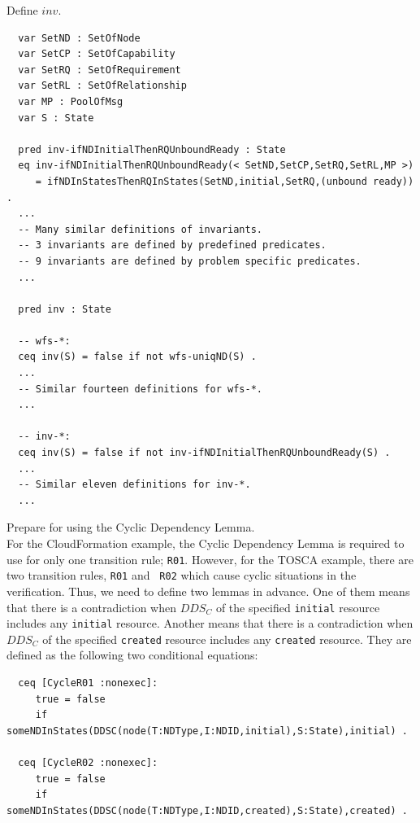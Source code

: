 \documentclass[12pt]{report}
\begin{document}
 Define $inv$. 
\small
\begin{verbatim}
  var SetND : SetOfNode
  var SetCP : SetOfCapability
  var SetRQ : SetOfRequirement
  var SetRL : SetOfRelationship
  var MP : PoolOfMsg
  var S : State

  pred inv-ifNDInitialThenRQUnboundReady : State
  eq inv-ifNDInitialThenRQUnboundReady(< SetND,SetCP,SetRQ,SetRL,MP >)
     = ifNDInStatesThenRQInStates(SetND,initial,SetRQ,(unbound ready)) .
  ...
  -- Many similar definitions of invariants.
  -- 3 invariants are defined by predefined predicates.
  -- 9 invariants are defined by problem specific predicates.
  ...

  pred inv : State

  -- wfs-*:
  ceq inv(S) = false if not wfs-uniqND(S) .
  ...
  -- Similar fourteen definitions for wfs-*.  
  ...

  -- inv-*:
  ceq inv(S) = false if not inv-ifNDInitialThenRQUnboundReady(S) .
  ...
  -- Similar eleven definitions for inv-*.  
  ...

\end{verbatim}
\normalsize

 Prepare for using the Cyclic Dependency
Lemma. \\
For the CloudFormation example, the Cyclic Dependency Lemma is
required to use for only one transition rule; {\tt R01}. However, for
the TOSCA example, there are two transition rules, {\tt R01} and {\tt
  R02} which cause cyclic situations in the verification. Thus, we
need to define two lemmas in advance.  One of them means that there is
a contradiction when $DDS_C$ of the specified {\tt initial} resource
includes any {\tt initial} resource.  Another means that there is a
contradiction when $DDS_C$ of the specified {\tt created} resource
includes any {\tt created} resource.  They are defined as the
following two conditional equations:
\small
\begin{verbatim}
  ceq [CycleR01 :nonexec]: 
     true = false
     if someNDInStates(DDSC(node(T:NDType,I:NDID,initial),S:State),initial) .

  ceq [CycleR02 :nonexec]: 
     true = false
     if someNDInStates(DDSC(node(T:NDType,I:NDID,created),S:State),created) .

\end{verbatim}
\normalsize
\end{document}
